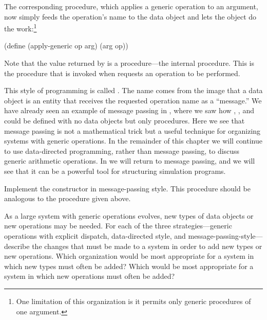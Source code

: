 \noindent
The corresponding  procedure, which applies a generic
operation to an argument, now simply feeds the operation's name to the data
object and lets the object do the work:\footnote{One limitation of this
organization is it permits only generic procedures of one argument.}

\begin{codeBlock}
(define (apply-generic op arg) (arg op))
\end{codeBlock}

\noindent
Note that the value returned by  is a procedure---the
internal  procedure.  This is the procedure that is invoked when
 requests an operation to be performed.

This style of programming is called .  The name comes
from the image that a data object is an entity that receives the requested
operation name as a ``message.''  We have already seen an example of message
passing in , where we saw how , , and
 could be defined with no data objects but only procedures.  Here we
see that message passing is not a mathematical trick but a useful technique for
organizing systems with generic operations.  In the remainder of this chapter
we will continue to use data-directed programming, rather than message passing,
to discuss generic arithmetic operations.  In  we will return to
message passing, and we will see that it can be a powerful tool for structuring
simulation programs.

\begin{exerciseGroup}
\label{Exercise 2.75}
 Implement the constructor
 in message-passing style.  This procedure should be
analogous to the  procedure given above.

\label{Exercise 2.76}
 As a large system with generic
operations evolves, new types of data objects or new operations may be needed.
For each of the three strategies---generic operations with explicit dispatch,
data-directed style, and message-passing-style---describe the changes that
must be made to a system in order to add new types or new operations.  Which
organization would be most appropriate for a system in which new types must
often be added?  Which would be most appropriate for a system in which new
operations must often be added?
\end{exerciseGroup}

